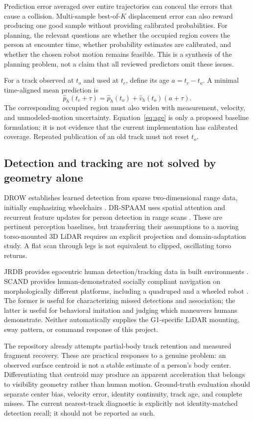 \documentclass[11pt,a4paper]{article}
\begin{document}
Prediction error averaged over entire trajectories can conceal the errors
that cause a collision. Multi-sample best-of-$K$ displacement error can also
reward producing one good sample without providing calibrated probabilities.
For planning, the relevant questions are whether the occupied region covers
the person at encounter time, whether probability estimates are calibrated,
and whether the chosen robot motion remains feasible. This is a synthesis
of the planning problem, not a claim that all reviewed predictors omit
these issues.

For a track observed at $t_o$ and used at $t_c$, define its age
$a=t_c-t_o$. A minimal time-aligned mean prediction is
\begin{equation}
\hat p_h(t_c+\tau)=\hat p_h(t_o)+\hat v_h(t_o)(a+\tau).
\label{eq:age}
\end{equation}
The corresponding occupied region must also widen with measurement,
velocity, and unmodeled-motion uncertainty. Equation~\ref{eq:age} is only
a proposed baseline formulation; it is not evidence that the current
implementation has calibrated coverage. Repeated publication of an old
track must not reset $t_o$.

\subsection{Detection and tracking are not solved by geometry alone}
DROW establishes learned detection from sparse two-dimensional range data,
initially emphasizing wheelchairs \citep{drow}. DR-SPAAM uses spatial
attention and recurrent feature updates for person detection in range scans
\citep{drspaam}. These are pertinent perception baselines, but transferring
their assumptions to a moving torso-mounted 3D LiDAR requires an explicit
projection and domain-adaptation study. A flat scan through legs is not
equivalent to clipped, oscillating torso returns.

JRDB provides egocentric human detection/tracking data in built environments
\citep{jrdb}. SCAND provides human-demonstrated socially compliant navigation
on morphologically different platforms, including a quadruped and a wheeled
robot \citep{scand}. The former is useful for characterizing missed detections
and association; the latter is useful for behavioral imitation and judging
which maneuvers humans demonstrate. Neither automatically supplies the
G1-specific LiDAR mounting, sway pattern, or command response of this project.

The repository already attempts partial-body track retention and measured
fragment recovery. These are practical responses to a genuine problem:
an observed surface centroid is not a stable estimate of a person's body
center. Differentiating that centroid may produce an apparent acceleration
that belongs to visibility geometry rather than human motion. Ground-truth
evaluation should separate center bias, velocity error, identity continuity,
track age, and complete misses. The current nearest-track diagnostic is
explicitly not identity-matched detection recall; it should not be reported
as such.
\end{document}
